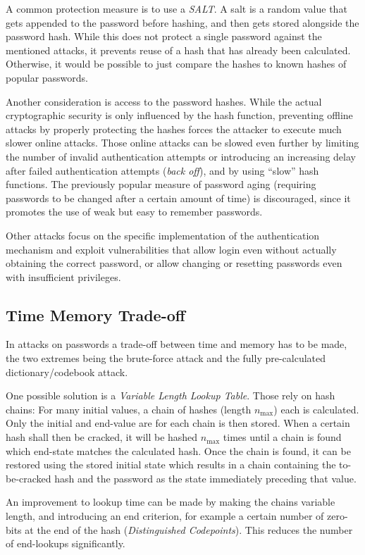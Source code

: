 A common protection measure is to use a \emph{SALT}. A salt is a random value
that gets appended to the password before hashing, and then gets stored
alongside the password hash. While this does not protect a single password
against the mentioned attacks, it prevents reuse of a hash that has already been
calculated. Otherwise, it would be possible to just compare the hashes to known
hashes of popular passwords.

Another consideration is access to the password hashes. While the actual
cryptographic security is only influenced by the hash function, preventing
offline attacks by properly protecting the hashes forces the attacker to execute
much slower online attacks. Those online attacks can be slowed even further by
limiting the number of invalid authentication attempts or introducing an
increasing delay after failed authentication attempts (\textit{back off}), and
by using ``slow'' hash functions. The previously popular measure of password
aging (requiring passwords to be changed after a certain amount of time) is
discouraged, since it promotes the use of weak but easy to remember passwords.

Other attacks focus on the specific implementation of the authentication
mechanism and exploit vulnerabilities that allow login even without actually
obtaining the correct password, or allow changing or resetting passwords even
with insufficient privileges.

\subsection{Time Memory Trade-off}
In attacks on passwords a trade-off between time and memory has to be made, the
two extremes being the brute-force attack and the fully pre-calculated
dictionary/codebook attack.

One possible solution is a \emph{Variable Length Lookup Table}. Those rely on
hash chains: For many initial values, a chain of hashes (length $n_\text{max}$)
each is calculated. Only the initial and end-value are for each chain is then
stored. When a certain hash shall then be cracked, it will be hashed
$n_\text{max}$ times until a chain is found which end-state matches the
calculated hash. Once the chain is found, it can be restored using the stored
initial state which results in a chain containing the to-be-cracked hash and the
password as the state immediately preceding that value.

An improvement to lookup time can be made by making the chains variable length,
and introducing an end criterion, for example a certain number of zero-bits at
the end of the hash (\emph{Distinguished Codepoints}). This reduces the number
of end-lookups significantly.

